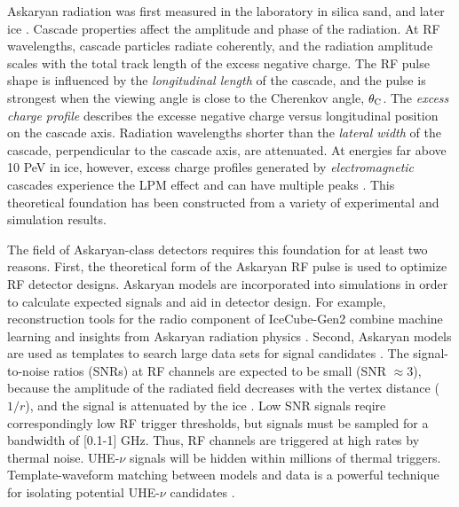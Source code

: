 \documentclass[amsmath,amssymb,aps,prd,10pt,twocolumn]{revtex4}
\begin{document}
Askaryan radiation was first measured in the laboratory in silica sand, and later ice \cite{saltzberg,10.1103/PhysRevD.74.043002,ask_ice}.  Cascade properties affect the amplitude and phase of the radiation.  At RF wavelengths, cascade particles radiate coherently, and the radiation amplitude scales with the total track length of the excess negative charge.  The RF pulse shape is influenced by the \textit{longitudinal length} of the cascade, and the pulse is strongest when the viewing angle is close to the Cherenkov angle, $\theta_{\rm C}$.  The \textit{excess charge profile} describes the excesse negative charge versus longitudinal position on the cascade axis.  Radiation wavelengths shorter than the \textit{lateral width} of the cascade, perpendicular to the cascade axis, are attenuated.  At energies far above 10 PeV in ice, however, excess charge profiles generated by \textit{electromagnetic} cascades experience the LPM effect and can have multiple peaks \cite{10.1016/j.astropartphys.2009.06.005,10.1103/physrevd.82.074017}.  This theoretical foundation has been constructed from a variety of experimental and simulation results.

The field of Askaryan-class detectors requires this foundation for at least two reasons.  First, the theoretical form of the Askaryan RF pulse is used to optimize RF detector designs.  Askaryan models are incorporated into simulations \cite{dookayka2011characterizing,testbed,10.1140/epjc/s10052-020-7612-8} in order to calculate expected signals and aid in detector design.  For example, reconstruction tools for the radio component of IceCube-Gen2 combine machine learning and insights from Askaryan radiation physics \cite{10.1140/epjc/s10052-019-6971-5,10.1088/1748-0221/15/09/p09039,IFT}.  Second, Askaryan models are used as templates to search large data sets for signal candidates \cite{10.1088/1475-7516/2020/03/053,10.1016/j.astropartphys.2014.09.002}.  The signal-to-noise ratios (SNRs) at RF channels are expected to be small (SNR $\approx 3$), because the amplitude of the radiated field decreases with the vertex distance ($1/r$), and the signal is attenuated by the ice \cite{10.3189/2015jog14j214,Barwick:2018497,ALLISON201963}.  Low SNR signals reqire correspondingly low RF trigger thresholds, but signals must be sampled for a bandwidth of [0.1-1] GHz.  Thus, RF channels are triggered at high rates by thermal noise.  UHE-$\nu$ signals will be hidden within millions of thermal triggers.  Template-waveform matching between models and data is a powerful technique for isolating potential UHE-$\nu$ candidates \cite{10.1016/j.astropartphys.2015.04.002,10.1016/j.astropartphys.2014.09.002}.
\end{document}
